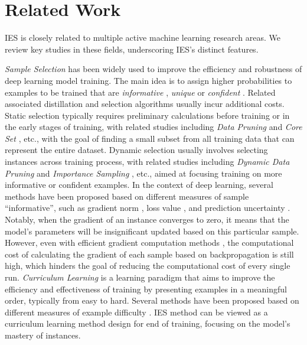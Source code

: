 \section{Related Work}
IES is closely related to multiple active machine learning research areas. We review key studies in these fields, underscoring IES's distinct features. 

\emph{Sample Selection} has been widely used to improve the efficiency and robustness of deep learning model training. The main idea is to assign higher probabilities to examples to be trained that are \emph{informative} \citep{alain2015variance, katharopoulos2017biased, katharopoulos2018not}, \emph{unique} \citep{loshchilov2015online, chang2017active, shi2021diversity} or \emph{confident} \citep{khim2020uniform}. Related associated distillation and selection algorithms usually incur additional costs. Static selection typically requires preliminary calculations before training or in the early stages of training, with related studies including \emph{Data Pruning} \citep{toneva2018empirical, paul2021deep, killamsetty2021glister} and \emph{Core Set} \citep{huggins2016coresets, huang2018epsilon, braverman2022power, xia2022moderate, xia2024refined}, etc., with the goal of finding a small subset from all training data that can represent the entire dataset. 
Dynamic selection usually involves selecting instances across training process, with related studies including \emph{Dynamic Data Pruning} \citep{raju2021accelerating, mindermann2022prioritized, he2023large, truong2023kakurenbo, qin2023infobatch} and \emph{Importance Sampling} \citep{alain2015variance, katharopoulos2017biased, katharopoulos2018not, JMLR:v19:16-241, jiang2019accelerating}, etc., aimed at focusing training on more informative or confident examples. 
In the context of deep learning, several methods have been proposed based on different measures of sample ``informative'', such as gradient norm \citep{alain2015variance, killamsetty2021grad}, loss value \citep{loshchilov2015online, schaul2015prioritized, mindermann2022prioritized}, and prediction uncertainty \citep{chang2017active}. 
Notably, when the gradient of an instance converges to zero, it means that the model's parameters will \textcolor{changecolor}{be} insignificant updated based on this particular sample. However, even with efficient gradient computation methods \citep{wei2017minimal, katharopoulos2017biased, katharopoulos2018not}, the computational cost of calculating the gradient of each sample based on backpropagation is still high, which hinders the goal of reducing the computational cost of every single run. \emph{Curriculum Learning}
 \citep{bengio2009curriculum, wu2021curricula, zhou2020curriculum, wang2024efficienttrain++, wang2024computation, kumar2010self} is a learning paradigm that aims to improve the efficiency and effectiveness of training by presenting examples in a meaningful order, typically from easy to hard. Several methods have been proposed based on different measures of example difficulty \citep{weinshall2018curriculum, saxena2019data, jiang2018mentornet}. IES method can be viewed as a curriculum learning method design for end of training, focusing on the model's mastery of instances.

